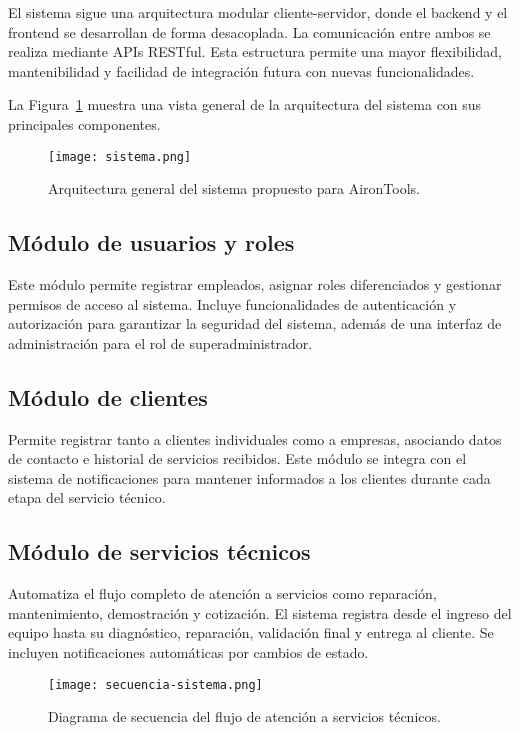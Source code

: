 El sistema sigue una arquitectura modular cliente-servidor, donde el backend y el frontend se desarrollan de forma desacoplada. La comunicación entre ambos se realiza mediante APIs RESTful. Esta estructura permite una mayor flexibilidad, mantenibilidad y facilidad de integración futura con nuevas funcionalidades.

La Figura~\ref{fig:arquitectura} muestra una vista general de la arquitectura del sistema con sus principales componentes.

\begin{figure}[H]
	\centering
	\texttt{[image: sistema.png]}
	\caption{Arquitectura general del sistema propuesto para AironTools.}
	\label{fig:arquitectura}
\end{figure}

\subsection*{Módulo de usuarios y roles}

Este módulo permite registrar empleados, asignar roles diferenciados y gestionar permisos de acceso al sistema. Incluye funcionalidades de autenticación y autorización para garantizar la seguridad del sistema, además de una interfaz de administración para el rol de superadministrador.

\subsection*{Módulo de clientes}

Permite registrar tanto a clientes individuales como a empresas, asociando datos de contacto e historial de servicios recibidos. Este módulo se integra con el sistema de notificaciones para mantener informados a los clientes durante cada etapa del servicio técnico.

\subsection*{Módulo de servicios técnicos}

Automatiza el flujo completo de atención a servicios como reparación, mantenimiento, demostración y cotización. El sistema registra desde el ingreso del equipo hasta su diagnóstico, reparación, validación final y entrega al cliente. Se incluyen notificaciones automáticas por cambios de estado.

\begin{figure}[H]
	\centering
	\texttt{[image: secuencia-sistema.png]}
	\caption{Diagrama de secuencia del flujo de atención a servicios técnicos.}
	\label{fig:secuencia}
\end{figure}

